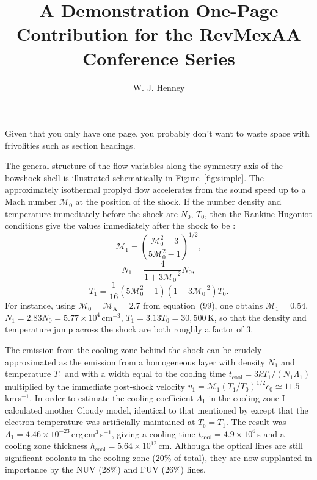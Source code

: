 \documentclass[preprint,proceedings]{rmaa}
\title{A Demonstration One-Page Contribution for the RevMexAA Conference Series}
\author{
  W. J. Henney\altaffilmark{1,2,3}}
\newcommand{\Sub}[1]{_\mathrm{#1}}
\begin{document}
\maketitle 



Given that you only have one page, you probably don't want to waste
space with frivolities such as section headings.  

The general structure of the flow variables along the symmetry axis of
the bowshock shell is illustrated schematically in
Figure~\ref{fig:simple}.  The approximately isothermal proplyd flow
accelerates from the sound speed up to a Mach number $\mathcal{M}_0$
at the position of the shock. If the number density and temperature
immediately before the shock are $N_0$, $T_0$, then the
Rankine-Hugoniot conditions give the values immediately after
the shock to be \citep{Bally98}:
\begin{equation}
  \label{eq:mjump}
  \mathcal{M}_1 = \left( \frac{ \mathcal{M}_0^2 + 3 } { 5
      \mathcal{M}_0^2 - 1 } \right)^{1/2} , 
\end{equation}
\begin{equation}
  \label{eq:njump}
  N_1 = \frac{ 4 } { 1 + 3 \mathcal{M}_0^{-2} } N_0 , 
\end{equation}
\begin{equation}
  \label{eq:tjump}
  T_1 = \frac{1}{16} \left( 5 \mathcal{M}_0^2 - 1 \right) 
  \left( 1 + 3 \mathcal{M}_0^{-2} \right) T_0 .
\end{equation}
For instance, using $\mathcal{M}_0 = \mathcal{M}\Sub{A} = 2.7$ from
equation~(99), one obtains $\mathcal{M}_1 = 0.54$,
$N_1 = 2.83 N_0 = 5.77 \times 10^4$\,cm$^{-3}$, $T_1 = 3.13 T_0 =
30,500$\,K, so that the density and temperature jump across the shock
are both roughly a factor of 3.

The emission from the cooling zone behind the shock can be crudely
approximated as the emission from a homogeneous layer with density
$N_1$ and temperature $T_1$ and with a width equal to the cooling time
$t\Sub{cool} = 3 k T_1 / \left( N_1 \Lambda_1 \right)$ multiplied by
the immediate post-shock velocity $v_1 = \mathcal{M}_1 (T_1/T_0)^{1/2}
c_0 \simeq 11.5$\,km\,s$^{-1}$. In order to estimate the cooling
coefficient $\Lambda_1$ in the cooling zone I calculated another
Cloudy model, identical to that mentioned  by \citet{Fulgencio} except that the
electron temperature was artificially maintained at $T\Sub{e} = T_1$.
The result was $\Lambda_1 = 4.46 \times
10^{-23}$\,erg\,cm$^{3}$\,s$^{-1}$, giving a cooling time $t\Sub{cool} =
4.9 \times 10^6$\,s and a cooling zone thickness $h\Sub{cool} = 5.64
\times 10^{12}$\,cm. Although the  optical lines are still
significant coolants in the cooling zone (20\% of total), they are now
supplanted in importance by the  NUV (28\%) and FUV (26\%)
lines.
\end{document}
